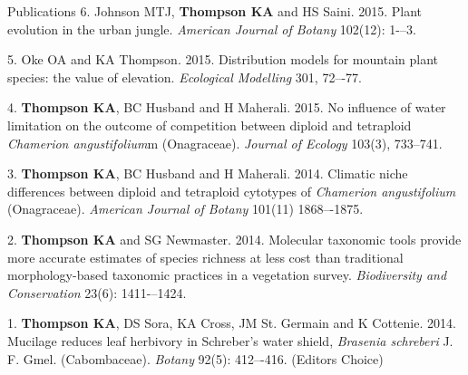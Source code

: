 \documentclass[11pt]{article}
\begin{document}
\begin{rSection}{Publications}
\noindent\hspace{.1cm}6. Johnson MTJ, \textbf{Thompson KA} and HS Saini. 2015. Plant evolution in the urban jungle. \textit{American Journal of Botany} 102(12): 1-–3. %

\noindent\hspace{.1cm}5. Oke OA and KA Thompson. 2015. Distribution models for mountain plant species: the value of elevation. \textit{Ecological Modelling} 301, 72–-77. %

\noindent\hspace{.1cm}4. \textbf{Thompson KA}, BC Husband and H Maherali. 2015. No influence of water limitation on the outcome of competition between diploid and tetraploid \textit{Chamerion angustifolium}m (Onagraceae). \textit{Journal of Ecology} 103(3), 733–741. %

\noindent\hspace{.1cm}3. \textbf{Thompson KA}, BC Husband and H Maherali. 2014. Climatic niche differences between diploid and tetraploid cytotypes of \textit{Chamerion angustifolium} (Onagraceae). \textit{American Journal of Botany} 101(11) 1868–-1875. %

\noindent\hspace{.1cm}2. \textbf{Thompson KA} and SG Newmaster. 2014. Molecular taxonomic tools provide more accurate estimates of species richness at less cost than traditional morphology-based taxonomic practices in a vegetation survey. \textit{Biodiversity and Conservation} 23(6): 1411-–1424. %

\noindent\hspace{.1cm}1. \textbf{Thompson KA}, DS Sora, KA Cross, JM St. Germain and K Cottenie. 2014. Mucilage reduces leaf herbivory in Schreber’s water shield, \textit{Brasenia schreberi} J. F. Gmel. (Cabombaceae). \textit{Botany} 92(5): 412–-416. %
(Editor\textquotesingle s Choice)

\vspace{0.5em} %


\end{rSection}
\end{document}
